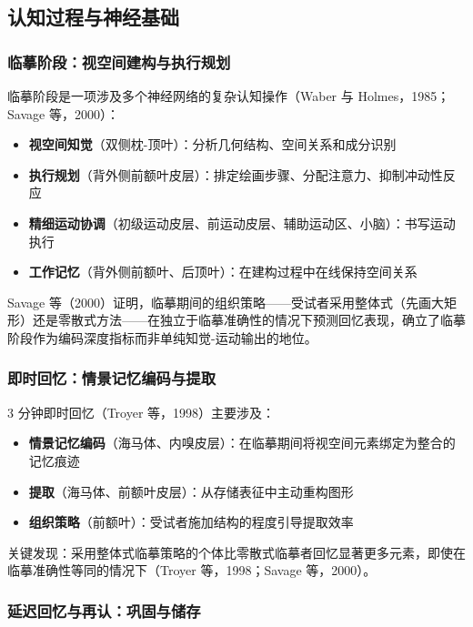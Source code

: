 \documentclass[12pt,a4paper]{ctexart}
\begin{document}
\subsection{认知过程与神经基础}

\subsubsection{临摹阶段：视空间建构与执行规划}

临摹阶段是一项涉及多个神经网络的复杂认知操作（Waber 与 Holmes，1985；Savage 等，2000）：

\begin{itemize}
\item \textbf{视空间知觉}（双侧枕-顶叶）：分析几何结构、空间关系和成分识别
\item \textbf{执行规划}（背外侧前额叶皮层）：排定绘画步骤、分配注意力、抑制冲动性反应
\item \textbf{精细运动协调}（初级运动皮层、前运动皮层、辅助运动区、小脑）：书写运动执行
\item \textbf{工作记忆}（背外侧前额叶、后顶叶）：在建构过程中在线保持空间关系
\end{itemize}

Savage 等（2000）证明，临摹期间的组织策略——受试者采用整体式（先画大矩形）还是零散式方法——在独立于临摹准确性的情况下预测回忆表现，确立了临摹阶段作为编码深度指标而非单纯知觉-运动输出的地位。

\subsubsection{即时回忆：情景记忆编码与提取}

3 分钟即时回忆（Troyer 等，1998）主要涉及：

\begin{itemize}
\item \textbf{情景记忆编码}（海马体、内嗅皮层）：在临摹期间将视空间元素绑定为整合的记忆痕迹
\item \textbf{提取}（海马体、前额叶皮层）：从存储表征中主动重构图形
\item \textbf{组织策略}（前额叶）：受试者施加结构的程度引导提取效率
\end{itemize}

关键发现：采用整体式临摹策略的个体比零散式临摹者回忆显著更多元素，即使在临摹准确性等同的情况下（Troyer 等，1998；Savage 等，2000）。

\subsubsection{延迟回忆与再认：巩固与储存}
\end{document}
